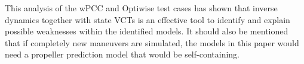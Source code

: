 This analysis of the wPCC and Optiwise test cases has shown that inverse dynamics together with state VCTs is an effective tool to identify and explain possible weaknesses within the identified models.
%
%
It should also be mentioned that if completely new maneuvers are simulated, the models in this paper would need a propeller prediction model that would be self-containing.
